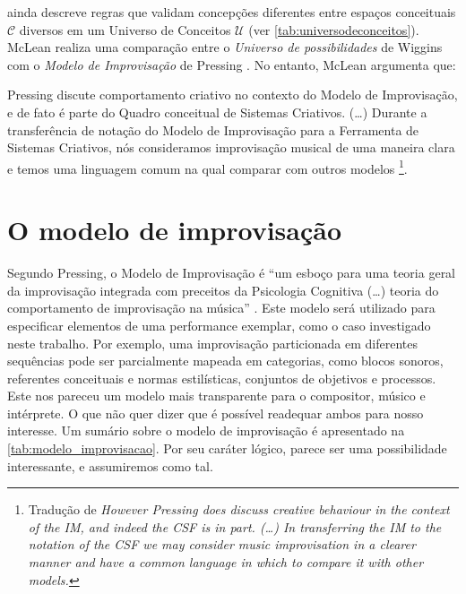 {\begin{table}[!h]
\begin{tabular}{ | p{4.25cm} | p{5.25cm} | p{5.25cm} |}
    \end{tabular}
\label{tab:universodeconceitos}
\end{table}

 ainda descreve regras que validam concepções diferentes entre espaços conceituais $\mathcal{C}$ diversos em um Universo de Conceitos $\mathcal{U}$ (ver \autoref{tab:universodeconceitos}). McLean realiza uma comparação entre o \emph{Universo de possibilidades} de Wiggins com o \emph{Modelo de Improvisação} de Pressing . No entanto, McLean argumenta que:

\begin{citacao}
Pressing discute comportamento criativo no contexto do Modelo de Improvisação, e de fato é parte do Quadro conceitual de Sistemas Criativos. (\ldots) Durante a transferência de notação do Modelo de Improvisação para a Ferramenta de Sistemas Criativos, nós consideramos improvisação musical de uma maneira clara e temos uma linguagem comum na qual comparar com outros modelos \footnote{Tradução de \emph{However Pressing does discuss creative behaviour in the context of the IM, and indeed the CSF is in part. (\ldots) In transferring the IM to the notation of the CSF we may consider music improvisation in a clearer manner and have a common language in which to compare it with other models.}}.
\end{citacao}




\section{O modelo de improvisação}\label{sec:im}

Segundo Pressing, o Modelo de Improvisação é ``um esboço para uma teoria geral da improvisação integrada com preceitos da Psicologia Cognitiva (\ldots) teoria do comportamento de improvisação na música'' \cite[p.~2]{pressing_improvisation_1987}. Este modelo será utilizado para especificar elementos de uma performance exemplar, como o caso investigado neste trabalho. Por exemplo, uma improvisação particionada em diferentes sequências pode ser parcialmente mapeada em categorias, como blocos sonoros, referentes conceituais e normas estilísticas, conjuntos de objetivos e processos. Este nos pareceu um modelo mais transparente para o compositor, músico e intérprete. O que não quer dizer que é possível readequar ambos para nosso interesse. Um sumário sobre o modelo de improvisação é apresentado na \autoref{tab:modelo_improvisacao}. Por seu caráter lógico, parece ser uma possibilidade interessante, e assumiremos como tal.

}
